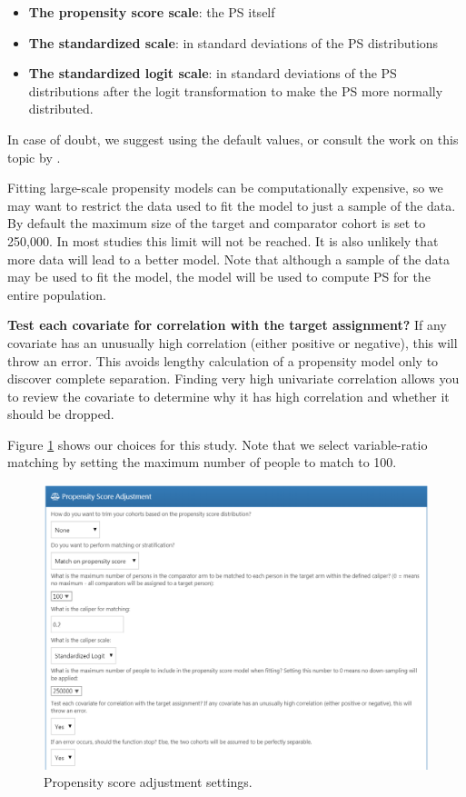 \documentclass[11pt]{book}
\providecommand{\tightlist}{%
  \setlength{\itemsep}{0pt}\setlength{\parskip}{0pt}}
\theoremstyle{definition}
\theoremstyle{definition}
\theoremstyle{definition}
\theoremstyle{remark}
\begin{document}
\begin{itemize}
\tightlist
\item
  \textbf{The propensity score scale}: the PS itself
\item
  \textbf{The standardized scale}: in standard deviations of the PS distributions
\item
  \textbf{The standardized logit scale}: in standard deviations of the PS distributions after the logit transformation to make the PS more normally distributed.
\end{itemize}

In case of doubt, we suggest using the default values, or consult the work on this topic by \citet{austin_2011}.

Fitting large-scale propensity models can be computationally expensive, so we may want to restrict the data used to fit the model to just a sample of the data. By default the maximum size of the target and comparator cohort is set to 250,000. In most studies this limit will not be reached. It is also unlikely that more data will lead to a better model. Note that although a sample of the data may be used to fit the model, the model will be used to compute PS for the entire population.

\textbf{Test each covariate for correlation with the target assignment?} If any covariate has an unusually high correlation (either positive or negative), this will throw an error. This avoids lengthy calculation of a propensity model only to discover complete separation. Finding very high univariate correlation allows you to review the covariate to determine why it has high correlation and whether it should be dropped.

Figure \ref{fig:psSettings} shows our choices for this study. Note that we select variable-ratio matching by setting the maximum number of people to match to 100.

\begin{figure}

{\centering \includegraphics[width=1\linewidth]{images/PopulationLevelEstimation/psSettings} 

}

\caption{Propensity score adjustment settings.}\label{fig:psSettings}
\end{figure}
\end{document}
